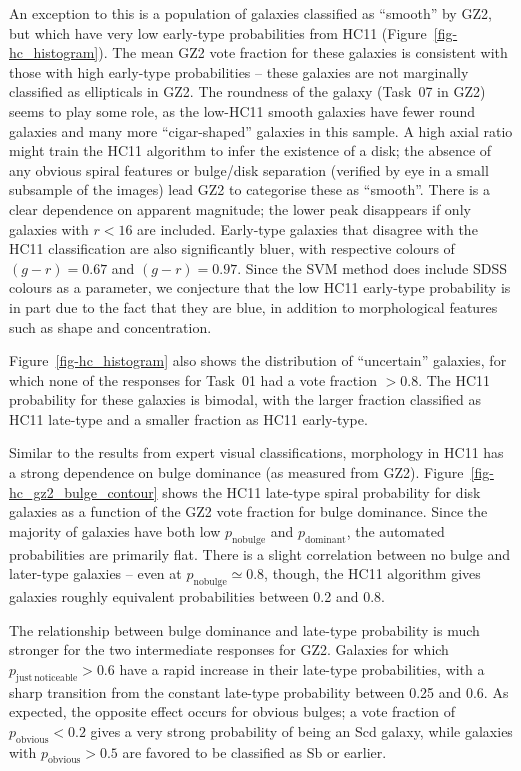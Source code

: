 \documentclass[useAMS,usenatbib]{mn2e}
\begin{document}
An exception to this is a population of galaxies classified as ``smooth'' by GZ2, but which have very low early-type probabilities from HC11 (Figure~\ref{fig-hc_histogram}). The mean GZ2 vote fraction for these galaxies is consistent with those with high early-type probabilities -- these galaxies are not marginally classified as ellipticals in GZ2. The roundness of the galaxy (Task~07 in GZ2) seems to play some role, as the low-HC11 smooth galaxies have fewer round galaxies and many more ``cigar-shaped'' galaxies in this sample. A high axial ratio might train the HC11 algorithm to infer the existence of a disk; the absence of any obvious spiral features or bulge/disk separation (verified by eye in a small subsample of the images) lead GZ2 to categorise these as ``smooth''. There is a clear dependence on apparent magnitude; the lower peak disappears if only galaxies with $r<16$ are included. Early-type galaxies that disagree with the HC11 classification are also significantly bluer, with respective colours of $(g-r)=0.67$ and $(g-r)=0.97$. Since the SVM method does include SDSS colours as a parameter, we conjecture that the low HC11 early-type probability is in part due to the fact that they are blue, in addition to morphological features such as shape and concentration. %

Figure~\ref{fig-hc_histogram} also shows the distribution of ``uncertain'' galaxies, for which none of the responses for Task~01 had a vote fraction $>0.8$. The HC11 probability for these galaxies is bimodal, with the larger fraction classified as HC11 late-type and a smaller fraction as HC11 early-type. 

Similar to the results from expert visual classifications, morphology in HC11 has a strong dependence on bulge dominance (as measured from GZ2). Figure~\ref{fig-hc_gz2_bulge_contour} shows the HC11 late-type spiral probability for disk galaxies as a function of the GZ2 vote fraction for bulge dominance. Since the majority of galaxies have both low $p_\mathrm{no bulge}$ and $p_\mathrm{dominant}$, the automated probabilities are primarily flat. There is a slight correlation between no bulge and later-type galaxies -- even at $p_\mathrm{no bulge}\simeq0.8$, though, the HC11 algorithm gives galaxies roughly equivalent probabilities between 0.2 and 0.8. 

The relationship between bulge dominance and late-type probability is much stronger for the two intermediate responses for GZ2. Galaxies for which $p_\mathrm{just~noticeable}>0.6$ have a rapid increase in their late-type probabilities, with a sharp transition from the constant late-type probability between 0.25 and 0.6. As expected, the opposite effect occurs for obvious bulges; a vote fraction of $p_\mathrm{obvious}<0.2$ gives a very strong probability of being an Scd galaxy, while galaxies with $p_\mathrm{obvious}>0.5$ are favored to be classified as Sb or earlier. 
\end{document}

